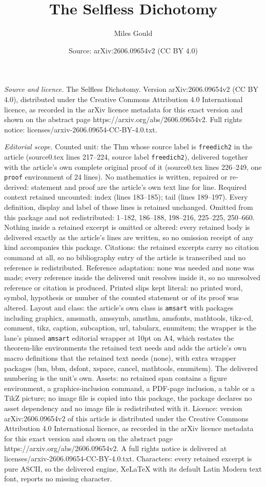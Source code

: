\documentclass[10pt,a4paper]{amsart}
\title[The Selfless Dichotomy]{The Selfless Dichotomy}
\author{Miles Gould}
\date{Source: arXiv:2606.09654v2 (CC BY 4.0)}
\begin{document}
\maketitle

\noindent\emph{Source and licence.} The Selfless Dichotomy. Version arXiv:2606.09654v2 (CC BY 4.0), distributed under the Creative Commons Attribution 4.0 International licence, as recorded in the arXiv licence metadata for this exact version and shown on the abstract page https://arxiv.org/abs/2606.09654v2. Full rights notice: licenses/arxiv-2606.09654-CC-BY-4.0.txt.\par\smallskip

\noindent\textit{Editorial scope.} Counted unit: the Thm whose source label is \texttt{freedich2} in the article (source0.tex lines 217--224, source label \texttt{freedich2}), delivered together with the article's own complete original proof of it (source0.tex lines 226--249, one \texttt{proof} environment of 24 lines). No mathematics is written, repaired or re-derived: statement and proof are the article's own text line for line. Required context retained uncounted: index (lines 183--185); tail (lines 189--197). Every definition, display and label of those lines is retained unchanged. Omitted from this package and not redistributed: 1--182, 186--188, 198--216, 225--225, 250--660. Nothing inside a retained excerpt is omitted or altered: every retained body is delivered exactly as the article's lines are written, so no omission receipt of any kind accompanies this package. Citations: the retained excerpts carry no citation command at all, so no bibliography entry of the article is transcribed and no reference is redistributed. Reference adaptation: none was needed and none was made; every reference inside the delivered unit resolves inside it, so no unresolved reference or citation is produced. Printed slips kept literal: no printed word, symbol, hypothesis or number of the counted statement or of its proof was altered. Layout and class: the article's own class is \texttt{amsart} with packages including graphicx, amsmath, amssymb, amsthm, amsfonts, mathtools, tikz-cd, comment, tikz, caption, subcaption, url, tabularx, enumitem; the wrapper is the lane's pinned \texttt{amsart} editorial wrapper at 10pt on A4, which restates the theorem-like environments the retained text needs and adds the article's own macro definitions that the retained text needs (none), with extra wrapper packages (bm, bbm, dsfont, xspace, cancel, mathtools, enumitem). The delivered numbering is the unit's own. Assets: no retained span contains a figure environment, a graphics-inclusion command, a PDF-page inclusion, a table or a TikZ picture; no image file is copied into this package, the package declares no asset dependency and no image file is redistributed with it. Licence: version arXiv:2606.09654v2 of this article is distributed under the Creative Commons Attribution 4.0 International licence, as recorded in the arXiv licence metadata for this exact version and shown on the abstract page https://arxiv.org/abs/2606.09654v2. A full rights notice is delivered at licenses/arxiv-2606.09654-CC-BY-4.0.txt. Characters: every retained excerpt is pure ASCII, so the delivered engine, XeLaTeX with its default Latin Modern text font, reports no missing character.
\end{document}
